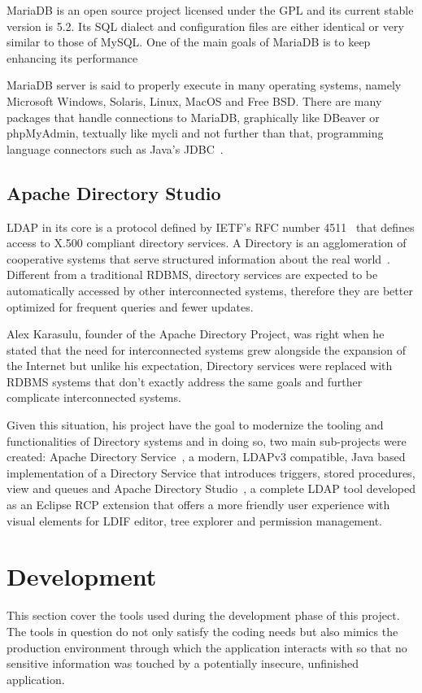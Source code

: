 MariaDB is an open source project licensed under the \gls{GPL} and its current stable version is 5.2. Its \gls{SQL} dialect and configuration files are either identical or very similar to those of MySQL. One of the main goals of MariaDB is to keep enhancing its performance~\cite{BARTHOLOMEW:2012}

MariaDB server is said to properly execute in many operating systems, namely Microsoft Windows, Solaris, Linux, MacOS and Free BSD. There are many packages that handle connections to MariaDB, graphically like DBeaver or phpMyAdmin, textually like mycli and not further than that, programming language connectors such as Java's \gls{JDBC}~\cite{MARIADB:2019}.

\subsection{Apache Directory Studio}\label{ads}
\gls{LDAP} in its core is a protocol defined by \gls{IETF}'s \gls{RFC} number 4511~\cite{ldaprfc} that defines access to X.500 compliant directory services. A Directory is an agglomeration of cooperative systems that serve structured information about the real world~\cite{x500}. Different from a traditional \gls{RDBMS}, directory services are expected to be automatically accessed by other interconnected systems, therefore they are better optimized for frequent queries and fewer updates.

Alex Karasulu, founder of the Apache Directory Project, was right when he stated that the need for interconnected systems grew alongside the expansion of the Internet but unlike his expectation, Directory services were replaced with \gls{RDBMS} systems that don't exactly address the same goals and further complicate interconnected systems\cite{apachedp}.

Given this situation, his project have the goal to modernize the tooling and functionalities of Directory systems and in doing so, two main sub-projects were created: Apache Directory Service~\cite{apachedservice}, a modern, \gls{LDAP}v3 compatible, Java based implementation of a Directory Service that introduces triggers, stored procedures, view and queues and Apache Directory Studio~\cite{apacheds}, a complete \gls{LDAP} tool developed as an Eclipse \gls{RCP} extension that offers a more friendly user experience with visual elements for  \gls{LDIF} editor, tree explorer and permission management.

\section{Development}\label{development}
This section cover the tools used during the development phase of this project. The tools in question do not only satisfy the coding needs but also mimics the production environment through which the application interacts with so that no sensitive information was touched by a potentially insecure, unfinished application.

